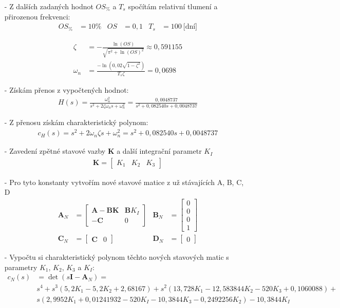 \documentclass{article}
\newcommand\mat[1]{\begin{bmatrix}#1\end{bmatrix}}
\begin{document}
\begin{itemize}
    \item[-] Z dalších zadaných hodnot $OS_\%$ a $T_s$ spočítám relativní tlumení a přirozenou frekvenci:
    \begin{align*}
        OS_\% &= 10\% & OS &= 0,1 & T_s &= 100 \ \text{[dní]}
    \end{align*}
    
    \begin{align*}
        \zeta &= -\frac{\ln{(OS)}}{\sqrt{\pi^2+\ln{(OS)}^2}} \approx 0,591155\\
        \omega_n &= \frac{-\ln{\left(0,02\sqrt{1-\zeta^2}\right)}}{T_s\zeta} = 0,0698
    \end{align*}

    \item[-] Získám přenos z vypočtených hodnot:
    \begin{align*}
        H(s) = \frac{\omega_n^2}{s^2+2\zeta \omega_ns+\omega_n^2} = \frac{0,0048737}{s^2+0,082540s+0,0048737}
    \end{align*}
    \item[-] Z přenosu získám charakteristický polynom: 
    \begin{align*}
        c_H(s) = s^2 + 2\omega_n\zeta s+\omega_n^2 = s^2+0,082540s+0,0048737
    \end{align*}

    \item[-] Zavedení zpětné stavové vazby $\mathbf{K}$ a další integrační parametr $K_I$
    \begin{align*}
        \mathbf{K} = \mat{K_1 & K_2 & K_3}
    \end{align*}
    \item[-] Pro tyto konstanty vytvořím nové stavové matice z už stávajících A, B, C, D 
    \begin{align*}
        \mathbf{A}_N &= \mat{\mathbf{A}-\mathbf{BK} & \mathbf{B}K_I\\
                             -\mathbf{C} & 0} 
        & 
        \mathbf{B}_N &= \mat{0\\ 0\\ 0\\ 1}\\
        \mathbf{C}_N &= \mat{\mathbf{C} & 0} 
        &
        \mathbf{D}_N &= \mat{0}
    \end{align*}

    \item[-] Vypočtu si charakteristický polynom těchto nových stavových matic s parametry $K_1$, $K_2$, $K_3$ a $K_I$:
    \begin{align*}
        c_N(s) &= \det{(s\mathbf{I}-\mathbf{A}_N)} =\\
        &s^4 + s^3(5,2K_1-5,2K_2+2,68167) + s^2(13,728K_1-12,583844K_2-520K_3+0,1060088)+\\
        &s(2,9952K_1+0,01241932-520K_I-10,3844K_3-0,2492256K_2) -10,3844K_I
    \end{align*}


\end{itemize}
\end{document}
